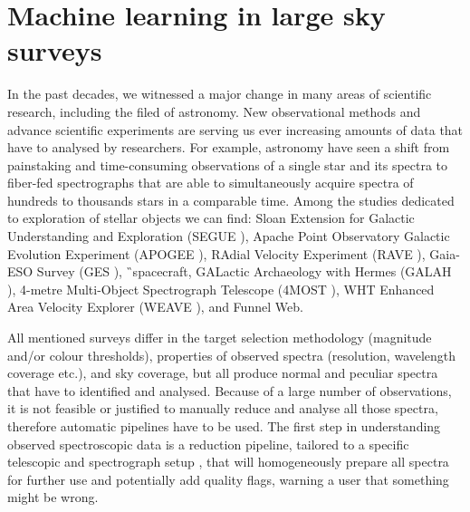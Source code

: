 \section{Machine learning in large sky surveys}
In the past decades, we witnessed a major change in many areas of scientific research, including the filed of astronomy. New observational methods and advance scientific experiments are serving us ever increasing amounts of data that have to analysed by researchers. For example, astronomy have seen a shift from painstaking and time-consuming observations of a single star and its spectra to fiber-fed spectrographs that are able to simultaneously acquire spectra of hundreds to thousands stars in a comparable time. Among the studies dedicated to exploration of stellar objects we can find: Sloan Extension for Galactic Understanding and Exploration (SEGUE \cite{2009AJ....137.4377Y}), Apache Point Observatory Galactic Evolution Experiment (APOGEE \cite{2017AJ....154...94M}), RAdial Velocity Experiment (RAVE \cite{2017AJ....153...75K}), Gaia-ESO Survey (GES \cite{2012Msngr.147...25G}), \G\ spacecraft, GALactic Archaeology with Hermes (GALAH \cite{2017MNRAS.465.3203M}), 4-metre Multi-Object Spectrograph Telescope (4MOST \cite{2012SPIE.8446E..0TD}), WHT Enhanced Area Velocity Explorer (WEAVE \cite{2012SPIE.8446E..0PD}), and Funnel Web.

All mentioned surveys differ in the target selection methodology (magnitude and/or colour thresholds), properties of observed spectra (resolution, wavelength coverage etc.), and sky coverage, but all produce normal and peculiar spectra that have to identified and analysed. Because of a large number of observations, it is not feasible or justified to manually reduce and analyse all those spectra, therefore automatic pipelines have to be used. The first step in understanding observed spectroscopic data is a reduction pipeline, tailored to a specific telescopic and spectrograph setup \cite{2017MNRAS.464.1259K, 2019arXiv191202905A, 2020arXiv200204377S}, that will homogeneously prepare all spectra for further use and potentially add quality flags, warning a user that something might be wrong.

